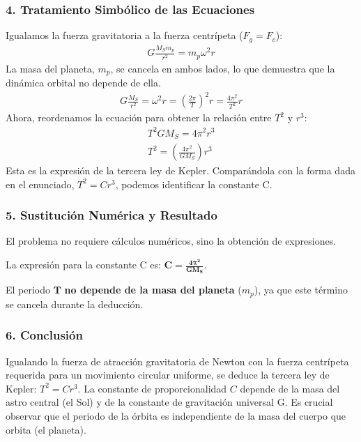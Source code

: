 \subsubsection*{4. Tratamiento Simbólico de las Ecuaciones}
Igualamos la fuerza gravitatoria a la fuerza centrípeta ($F_g = F_c$):
\begin{gather}
    G \frac{M_S m_p}{r^2} = m_p \omega^2 r
\end{gather}
La masa del planeta, $m_p$, se cancela en ambos lados, lo que demuestra que la dinámica orbital no depende de ella.
\begin{gather}
    G \frac{M_S}{r^2} = \omega^2 r = \left(\frac{2\pi}{T}\right)^2 r = \frac{4\pi^2}{T^2} r
\end{gather}
Ahora, reordenamos la ecuación para obtener la relación entre $T^2$ y $r^3$:
\begin{gather}
    T^2 G M_S = 4\pi^2 r^3 \nonumber \\[8pt]
    T^2 = \left(\frac{4\pi^2}{G M_S}\right) r^3
\end{gather}
Esta es la expresión de la tercera ley de Kepler. Comparándola con la forma dada en el enunciado, $T^2 = C r^3$, podemos identificar la constante C.

\subsubsection*{5. Sustitución Numérica y Resultado}
El problema no requiere cálculos numéricos, sino la obtención de expresiones.
\begin{cajaresultado}
    La expresión para la constante C es: $\boldsymbol{C = \frac{4\pi^2}{G M_S}}$.
\end{cajaresultado}
\medskip
\begin{cajaresultado}
    El periodo $\boldsymbol{T}$ \textbf{no depende de la masa del planeta} ($m_p$), ya que este término se cancela durante la deducción.
\end{cajaresultado}

\subsubsection*{6. Conclusión}
\begin{cajaconclusion}
    Igualando la fuerza de atracción gravitatoria de Newton con la fuerza centrípeta requerida para un movimiento circular uniforme, se deduce la tercera ley de Kepler: $T^2 = C r^3$. La constante de proporcionalidad $C$ depende de la masa del astro central (el Sol) y de la constante de gravitación universal G. Es crucial observar que el periodo de la órbita es independiente de la masa del cuerpo que orbita (el planeta).
\end{cajaconclusion}

